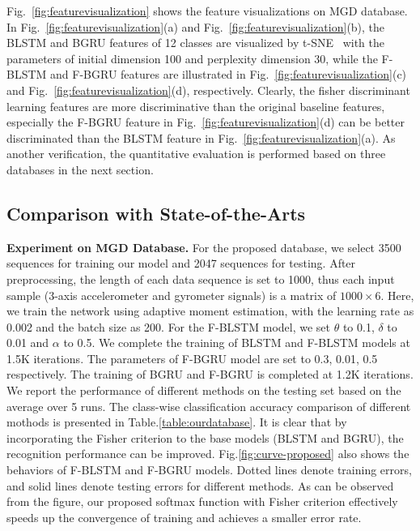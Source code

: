 \documentclass[review]{elsarticle}
\begin{document}
Fig.~\ref{fig:featurevisualization} shows the feature visualizations on MGD database. In Fig.~\ref{fig:featurevisualization}(a) and Fig.~\ref{fig:featurevisualization}(b), the BLSTM and BGRU features of 12 classes are visualized by t-SNE~\cite{Maaten2009Science} with the parameters of initial dimension 100 and perplexity dimension 30, while the F-BLSTM and F-BGRU features are illustrated in Fig.~\ref{fig:featurevisualization}(c) and Fig.~\ref{fig:featurevisualization}(d), respectively. Clearly, the fisher discriminant learning features are more discriminative than the original baseline features, especially the F-BGRU feature in Fig.~\ref{fig:featurevisualization}(d) can be better discriminated than the BLSTM feature in Fig.~\ref{fig:featurevisualization}(a). As another verification, the quantitative evaluation is performed based on three databases in the next section.

\subsection{Comparison with State-of-the-Arts}\label{sec:comparison}
\textbf{Experiment on {MGD} Database.}
For the proposed database, we select 3500 sequences for training our model and 2047 sequences for testing. After preprocessing, the length of each data sequence is set to 1000, thus each input sample (3-axis accelerometer and gyrometer signals) is a matrix of {$1000 \times 6$}. Here, we train the network using adaptive moment estimation, with the learning rate as 0.002 and the batch size as 200. For the F-BLSTM model, we set $\theta$ to 0.1, $\delta$ to 0.01 and $\alpha$ to 0.5. We complete the training of BLSTM and F-BLSTM models at 1.5K iterations. The parameters of F-BGRU model are set to 0.3, 0.01, 0.5 respectively. The training of BGRU and F-BGRU is completed at 1.2K iterations. We report the performance of different methods on the testing set based on the average over 5 runs. The class-wise classification accuracy comparison of different mothods is presented in Table.\;\ref{table:ourdatabase}. It is clear that by incorporating the Fisher criterion to the base models (BLSTM and BGRU), the recognition performance can be improved. Fig.\;\ref{fig:curve-proposed} also shows the behaviors of F-BLSTM and F-BGRU models. Dotted lines denote training errors, and solid lines denote testing errors for different methods. As can be observed from the figure, our proposed softmax function with Fisher criterion effectively speeds up the convergence of training and achieves a smaller error rate.
\end{document}
